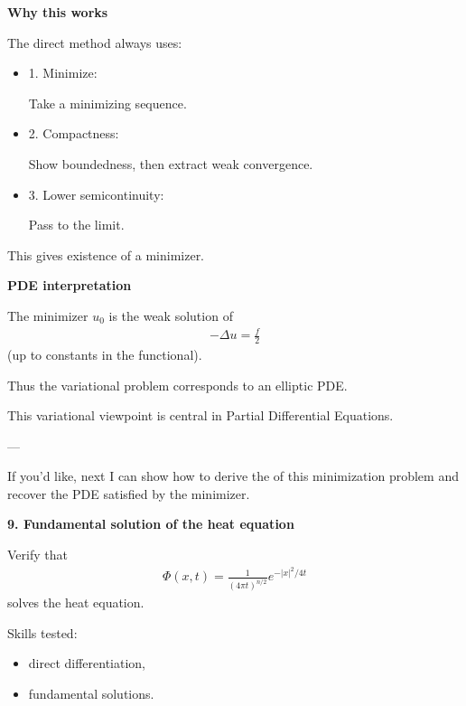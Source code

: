\documentclass[12pt,a4paper]{report}
\begin{document}
\begin{description}
\begin{description}
\item \textbf{Why this works}

The direct method always uses:

		\begin{itemize}
        \item 1. Minimize:

Take a minimizing sequence.

        \item 2. Compactness:

Show boundedness, then extract weak convergence.

        \item 3. Lower semicontinuity:

Pass to the limit.

		\end{itemize}

This gives existence of a minimizer.

\item \textbf{PDE interpretation}

The minimizer $u_0$ is the weak solution of
\begin{align*}
-\Delta u=\frac{f}{2}
\end{align*}
(up to constants in the functional).

Thus the variational problem corresponds to an elliptic PDE.

This variational viewpoint is central in Partial Differential Equations.

---
\end{description}

If you'd like, next I can show how to derive the  of this minimization problem and recover the PDE satisfied by the minimizer.


\newpage\item \textbf{9. Fundamental solution of the heat equation}

Verify that
\begin{align*}
\Phi(x,t)=\frac{1}{(4\pi t)^{n/2}}e^{-|x|^2/4t}
\end{align*}
solves the heat equation.

Skills tested:

	\begin{itemize}
    \item direct differentiation,
    \item fundamental solutions.
	\end{itemize}


\end{description}
\end{document}
